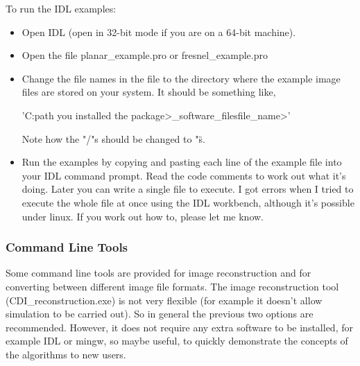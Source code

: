 \documentclass[]{cxs-software}
\begin{document}
To run the IDL examples:
\begin{itemize}
\item Open IDL (open in 32-bit mode if you are on a 64-bit machine).
\item Open the file planar\_example.pro or fresnel\_example.pro
\item Change the file names in the file to the directory where the
  example image files are stored on your system. It should be
  something like,
  \begin{myverbatim}
    'C:\<path you installed the package>\cxs_software\examples\image_files\<file_name>'
  \end{myverbatim}
     Note how the "/"s should be changed to "\"s.
   \item Run the examples by copying and pasting each line of the
     example file into your IDL command prompt. Read the code comments
     to work out what it's doing. Later you can write a single file to
     execute. I got errors when I tried to execute the whole file at
     once using the IDL workbench, although it's possible under
     linux. If you work out how to, please let me know.
\end{itemize}


\subsubsection{Command Line Tools}

Some command line tools are provided for image reconstruction and for
converting between different image file formats. The image
reconstruction tool (CDI\_reconstruction.exe) is not very flexible
(for example it doesn't allow simulation to be carried out). So in
general the previous two options are recommended.  However, it does
not require any extra software to be installed, for example IDL or
mingw, so maybe useful, to quickly demonstrate the concepts of the
algorithms to new users.
\end{document}
